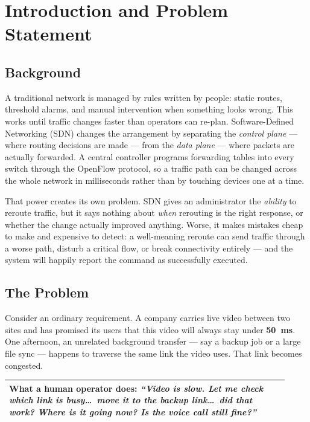 \documentclass[12pt,a4paper]{report}
\begin{document}
\tableofcontents
\newpage

\section{Introduction and Problem Statement}

\subsection{Background}

A traditional network is managed by rules written by people: static routes,
threshold alarms, and manual intervention when something looks wrong. This works
until traffic changes faster than operators can re-plan. Software-Defined
Networking (SDN) changes the arrangement by separating the \emph{control plane}
--- where routing decisions are made --- from the \emph{data plane} --- where
packets are actually forwarded. A central controller programs forwarding tables
into every switch through the OpenFlow protocol, so a traffic path can be
changed across the whole network in milliseconds rather than by touching devices
one at a time.

That power creates its own problem. SDN gives an administrator the \emph{ability}
to reroute traffic, but it says nothing about \emph{when} rerouting is the right
response, or whether the change actually improved anything. Worse, it makes
mistakes cheap to make and expensive to detect: a well-meaning reroute can send
traffic through a worse path, disturb a critical flow, or break connectivity
entirely --- and the system will happily report the command as successfully
executed.

\subsection{The Problem}

Consider an ordinary requirement. A company carries live video between two
sites and has promised its users that this video will always stay under
\textbf{50~ms}. One afternoon, an unrelated background transfer --- say a backup
job or a large file sync --- happens to traverse the same link the video uses.
That link becomes congested.

\begin{center}
\begin{tabular}{@{}p{0.92\linewidth}@{}}
\toprule
\textbf{What a human operator does:}
\quad\emph{``Video is slow. Let me check which link is busy\ldots\ move it to
the backup link\ldots\ did that work? Where is it going now? Is the voice call
still fine?''} \\
\bottomrule
\end{tabular}
\end{center}
\end{document}
